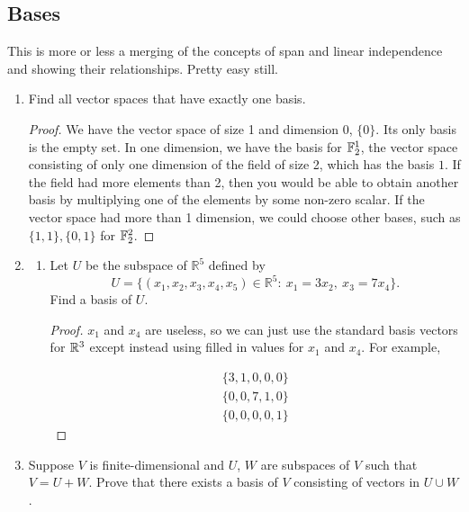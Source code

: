 \subsection{Bases}

This is more or less a merging of the concepts of span and linear independence and showing their relationships. Pretty easy still.

\begin{enumerate}
    \item Find all vector spaces that have exactly one basis.
    
    \begin{proof}
        We have the vector space of size 1 and dimension 0, $\{0\}$. Its only basis is the empty set. In one dimension, we have the basis for $\mathbb{F}^1_2$, the vector space consisting of only one dimension of the field of size 2, which has the basis $1$. If the field had more elements than 2, then you would be able to obtain another basis by multiplying one of the elements by some non-zero scalar. If the vector space had more than 1 dimension, we could choose other bases, such as $\{1, 1\}, \{0, 1\}$ for $\mathbb{F}_2^2$.
    \end{proof}


    \item[3]
    \begin{enumerate}
        \item Let $U$ be the subspace of $\mathbb{R}^5$ defined by
        \[
        U=\{(x_1,x_2,x_3,x_4,x_5)\in\mathbb{R}^5:\ x_1=3x_2,\ x_3=7x_4\}.
        \]
        Find a basis of $U$.

        \begin{proof}
            $x_1$ and $x_4$ are useless, so we can just use the standard basis vectors for $\mathbb{R}^3$ except instead using filled in values for $x_1$ and $x_4$. For example, 

            \begin{align*}
            \{3, 1, 0, 0, 0\} \\
            \{0, 0, 7, 1, 0\} \\
            \{0, 0, 0, 0, 1\}
            \end{align*}

        \end{proof}
    \end{enumerate}

    \item[5] Suppose $V$ is finite-dimensional and $U$, $W$ are subspaces of $V$ such that
    $V = U + W$. Prove that there exists a basis of $V$ consisting of vectors in
    $U \cup W$.
    

\end{enumerate}
